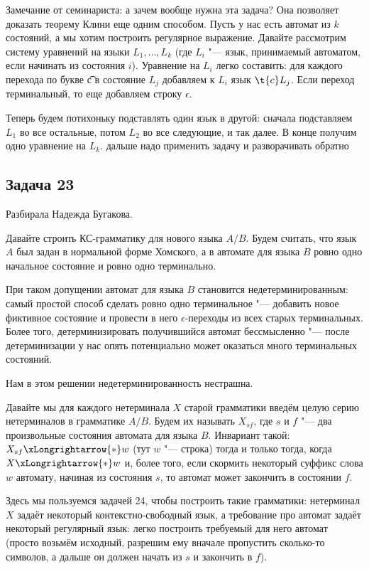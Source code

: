 	\begin{Rem}
		Замечание от семинариста: а зачем вообще нужна эта задача?
		Она позволяет доказать теорему Клини еще одним способом.
		Пусть у нас есть автомат из $k$ состояний, а мы хотим построить регулярное выражение.
		Давайте рассмотрим систему уравнений на языки $L_1, \dots, L_k$ (где $L_i$ "--- язык,
		принимаемый автоматом, если начинать из состояния $i$).
		Уравнение на $L_i$ легко составить: для каждого перехода по букве \t{c} в состояние $L_j$
		добавляем к $L_i$ язык $\t{c}L_j$.
		Если переход терминальный, то еще добавляем строку $\epsilon$.

		Теперь будем потихоньку подставлять один язык в другой: сначала подставляем $L_1$ во все остальные,
		потом $L_2$ во все следующие, и так далее.
		В конце получим одно уравнение на $L_k$.
		\TODO дальше надо применить задачу и разворачивать обратно
	\end{Rem}

\subsection{Задача 23}
	Разбирала Надежда Бугакова.

	Давайте строить КС-грамматику для нового языка $A/B$.
	Будем считать, что язык $A$ был задан в нормальной форме Хомского,
	а в автомате для языка $B$ ровно одно начальное состояние и ровно одно терминально.
	\begin{Rem}
		При таком допущении автомат для языка $B$ становится недетерминированным: самый простой способ
		сделать ровно одно терминальное "--- добавить новое фиктивное состояние и провести в него $\epsilon$-переходы из всех старых терминальных.
		Более того, детерминизировать получившийся автомат бессмысленно "--- после детерминизации у нас опять потенциально может оказаться много терминальных состояний.

		Нам в этом решении недетерминированность нестрашна.
	\end{Rem}
	Давайте мы для каждого нетерминала $X$ старой грамматики введём целую серию нетерминалов в грамматике $A/B$.
	Будем их называть $X_{sf}$, где $s$ и $f$ "--- два произвольные состояния автомата для языка $B$.
	Инвариант такой: $X_{sf}\xLongrightarrow{*} w$ (тут $w$ "--- строка) тогда и только тогда,
	когда $X \xLongrightarrow{*} w$ и, более того, если скормить некоторый суффикс слова $w$ автомату,
	начиная из состояния $s$, то автомат может закончить в состоянии $f$.

	Здесь мы пользуемся задачей 24, чтобы построить такие грамматики: нетерминал $X$ задаёт некоторый
	контекстно-свободный язык, а требование про автомат задаёт некоторый регулярный язык: легко построить
	требуемый для него автомат (просто возьмём исходный, разрешим ему вначале пропустить сколько-то символов,
	а дальше он должен начать из $s$ и закончить в $f$).


